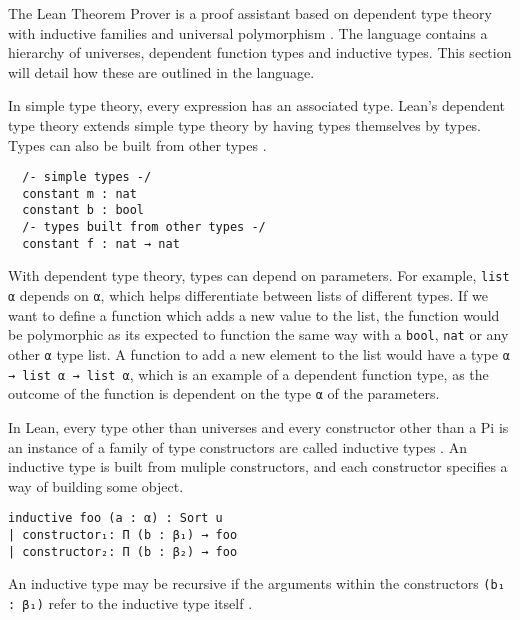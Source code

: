 The Lean Theorem Prover is a proof assistant based on dependent type theory with inductive families and universal polymorphism \cite{inductive_families}. The language contains a hierarchy of universes, dependent function types and inductive types. This section will detail how these are outlined in the language.

In simple type theory, every expression has an associated type. Lean's dependent type theory extends simple type theory by having types themselves by types. Types can also be built from other types \cite{lean:manual}.  

\begin{lstlisting}
  /- simple types -/
  constant m : nat
  constant b : bool
  /- types built from other types -/
  constant f : nat → nat
\end{lstlisting}

With dependent type theory, types can depend on parameters. For example, \lstinline{list α} depends on \lstinline{α}, which helps differentiate between lists of different types. If we want to define a function which adds a new value to the list, the function would be polymorphic as its expected to function the same way with a \lstinline{bool}, \lstinline{nat} or any other \lstinline{α} type list. A function to add a new element to the list would have a type \lstinline{α → list α → list α}, which is an example of a dependent function type, as the outcome of the function is dependent on the type \lstinline{α} of the parameters.

In Lean, every type other than universes and every constructor other than a Pi is an instance of a family of type constructors are called inductive types \cite{lean:manual}. An inductive type is built from muliple constructors, and each constructor specifies a way of building some object. 

\begin{lstlisting}
inductive foo (a : α) : Sort u
| constructor₁: Π (b : β₁) → foo
| constructor₂: Π (b : β₂) → foo
\end{lstlisting}

An inductive type may be recursive if the arguments within the constructors \lstinline{(b₁ : β₁)} refer to the inductive type itself \cite{lean:reference}.

